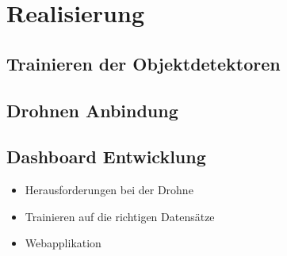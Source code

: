 \chapter{Realisierung}

\section{Trainieren der Objektdetektoren}

\section{Drohnen Anbindung}

\section{Dashboard Entwicklung}

\begin{itemize}
	\item Herausforderungen bei der Drohne
	\item Trainieren auf die richtigen Datensätze
	\item Webapplikation
\end{itemize}